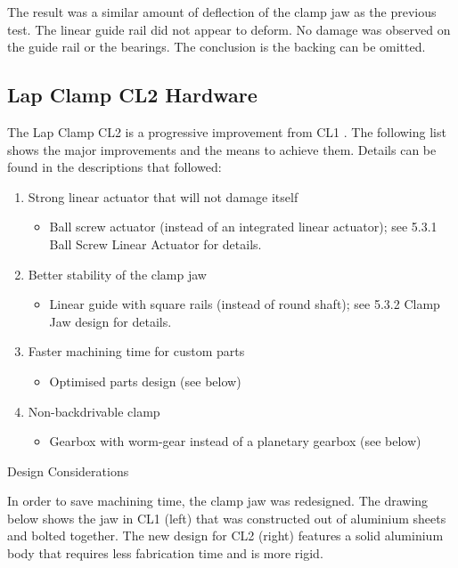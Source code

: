 The result was a similar amount of deflection of the clamp jaw as the previous test. The linear guide rail did not appear to deform. No damage was observed on the guide rail or the bearings. The conclusion is the backing can be omitted.

\subsection{Lap Clamp CL2 Hardware}
\label{subsection:exploration-2-lap-clamp-cl2-hardware}

The Lap Clamp CL2 is a progressive improvement from CL1 . The following list shows the major improvements and the means to achieve them. Details can be found in the descriptions that followed:
\begin{enumerate}
\item Strong linear actuator that will not damage itself
    \begin{itemize}
        \item Ball screw actuator (instead of an integrated linear actuator); see 5.3.1 Ball Screw Linear Actuator for details.
    \end{itemize}
    \item Better stability of the clamp jaw 
    \begin{itemize}
        \item Linear guide with square rails (instead of round shaft); see 5.3.2 Clamp Jaw design for details.
    \end{itemize}
    \item Faster machining time for custom parts
    \begin{itemize}
        \item Optimised parts design (see below)
    \end{itemize}
    \item Non-backdrivable clamp
    \begin{itemize}
        \item Gearbox with worm-gear instead of a planetary gearbox (see below)
    \end{itemize}
\end{enumerate}

Design Considerations

In order to save machining time, the clamp jaw was redesigned. The drawing below shows the jaw in CL1 (left) that was constructed out of aluminium sheets and bolted together. The new design for CL2 (right) features a solid aluminium body that requires less fabrication time and is more rigid. 

